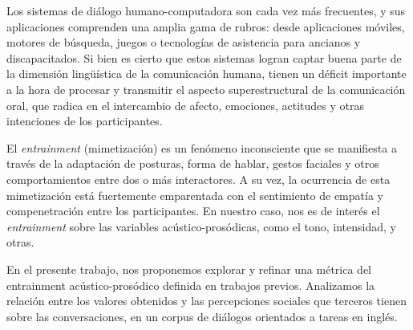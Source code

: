 Los sistemas de diálogo humano-computadora son cada vez más frecuentes, y sus aplicaciones comprenden una amplia gama de rubros: desde aplicaciones móviles, motores de búsqueda, juegos o tecnologías de asistencia para ancianos y discapacitados. Si bien es cierto que estos sistemas logran captar buena parte de la dimensión lingüística de la comunicación humana, tienen un déficit importante a la hora de procesar y transmitir el aspecto superestructural de la comunicación oral, que radica en el intercambio de afecto, emociones, actitudes y otras intenciones de los participantes.

El \emph{entrainment} (mimetización) es un fenómeno inconsciente que se manifiesta a través de la adaptación de posturas, forma de hablar, gestos faciales y otros comportamientos entre dos o más interactores. A su vez, la ocurrencia de esta mimetización está fuertemente emparentada con el sentimiento de empatía y compenetración entre los participantes. En nuestro caso, nos es de interés el \emph{entrainment} sobre las variables acústico-prosódicas, como el tono, intensidad, y otras.

En el presente trabajo, nos proponemos explorar y refinar una métrica del entrainment acústico-prosódico definida en trabajos previos. Analizamos la relación entre los valores obtenidos y las percepciones sociales que terceros tienen sobre las conversaciones, en un corpus de diálogos orientados a tareas en inglés.